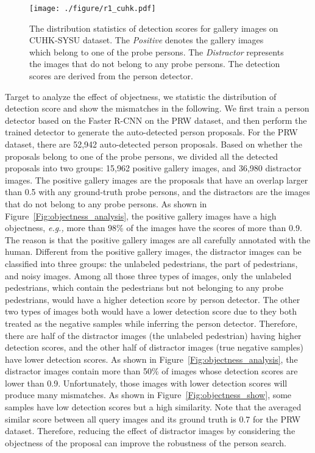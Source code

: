 \documentclass[journal]{IEEEtran}
\begin{document}
\begin{figure}
\begin{center}
\texttt{[image: ./figure/r1\_cuhk.pdf]}
\end{center}
\caption{The distribution statistics of detection scores for gallery images on CUHK-SYSU dataset. The \emph{Positive} denotes the gallery images which belong to one of the probe persons. The \emph{Distractor} represents the images that do not belong to any probe persons. The detection scores are derived from the person detector.}
\label{Fig:objectness_cuhk}
\end{figure}

Target to analyze the effect of objectness, we statistic the distribution of detection score and show the mismatches in the following. 
We first train a person detector based on the Faster R-CNN on the PRW dataset, and then perform the trained detector to generate the auto-detected person proposals. 
For the PRW dataset, there are 52,942 auto-detected person proposals. 
Based on whether the proposals belong to one of the probe persons, we divided all the detected proposals into two groups: 15,962 positive gallery images, and 36,980 distractor images. 
The positive gallery images are the proposals that have an overlap larger than 0.5 with any ground-truth probe persons, and the distractors are the images that do not belong to any probe persons. 
As shown in Figure~\ref{Fig:objectness_analysis}, the positive gallery images have a high objectness, \emph{e.g.,} more than 98\% of the images have the scores of more than 0.9.
The reason is that the positive gallery images are all carefully annotated with the human.
 Different from the positive gallery images, the distractor images can be classified into three groups: the unlabeled pedestrians, the part of pedestrians, and noisy images. 
 Among all those three types of images, only the unlabeled pedestrians, which contain the pedestrians but not belonging to any probe pedestrians, would have a higher detection score by person detector. 
 The other two types of images both would have a lower detection score due to they both treated as the negative samples while inferring the person detector. 
Therefore, there are half of the distractor images (the unlabeled pedestrian) having higher detection scores, and the other half of distractor images (true negative samples) have lower detection scores.
 As shown in Figure~\ref{Fig:objectness_analysis},  the distractor images contain more than 50\% of images whose detection scores are lower than 0.9. 
 Unfortunately, those images with lower detection scores will produce many mismatches. 
 As shown in  Figure~\ref{Fig:objectness_show}, some samples have low detection scores but a high similarity. Note that the averaged similar score between all query images and its ground truth is 0.7 for the PRW dataset. Therefore, reducing the effect of distractor images by considering the objectness of the proposal can improve the robustness of the person search.
\end{document}
